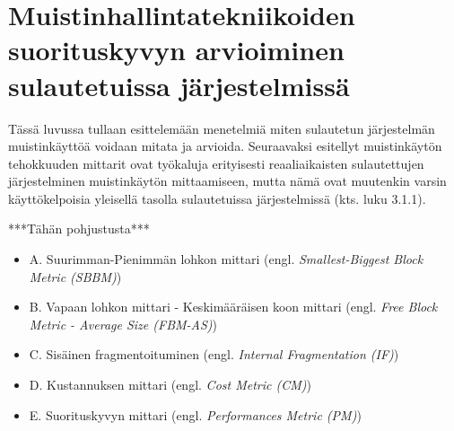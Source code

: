 \chapter{Muistinhallintatekniikoiden suorituskyvyn arvioiminen sulautetuissa järjestelmissä} \label{Kuudes luku}

Tässä luvussa tullaan esittelemään menetelmiä miten sulautetun järjestelmän muistinkäyttöä voidaan mitata ja arvioida. Seuraavaksi esitellyt muistinkäytön tehokkuuden mittarit ovat työkaluja erityisesti reaaliaikaisten sulautettujen järjestelminen muistinkäytön mittaamiseen, mutta nämä ovat muutenkin varsin käyttökelpoisia yleisellä tasolla sulautetuissa järjestelmissä (kts. luku 3.1.1).

***Tähän pohjustusta***\cite{tmtt@2006}

\begin{itemize}
\item{A. Suurimman-Pienimmän lohkon mittari                           (engl. \textit{Smallest-Biggest Block Metric (SBBM)})}
\item{B. Vapaan lohkon mittari - Keskimääräisen koon mittari          (engl. \textit{Free Block Metric - Average Size (FBM-AS)})}
\item{C. Sisäinen fragmentoituminen                                   (engl. \textit{Internal Fragmentation (IF)})}
\item{D. Kustannuksen mittari                                         (engl. \textit{Cost Metric (CM)})}
\item{E. Suorituskyvyn mittari                                        (engl. \textit{Performances Metric (PM)})}
\end{itemize}


